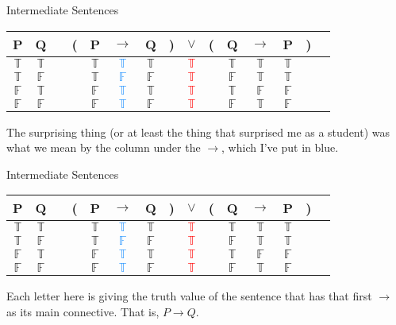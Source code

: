 \documentclass[
  ignorenonframetext,
]{beamer}
\renewcommand{\,}{\text{, }}
\def\True{\mathbb{T}}
\def\False{\mathbb{F}}
\begin{document}
\begin{frame}{Intermediate Sentences}
\protect\hypertarget{intermediate-sentences}{}
\begin{center}
\begin{tabular}{@{ }c@{ }@{ }c | c@{ }@{}c@{}@{ }c@{ }@{ }c@{ }@{ }c@{ }@{}c@{}@{ }c@{ }@{}c@{}@{ }c@{ }@{ }c@{ }@{ }c@{ }@{}c@{}@{ }c}
P & Q &  & ( & P & $\rightarrow$ & Q & ) & $\lor$ & ( & Q & $\rightarrow$ & P & ) & \\
\hline 
$\True$ & $\True$ &  &  & $\True$ & \textcolor{dodgerblue}{$\True$} & $\True$ &  & \textcolor{red}{$\True$} &  & $\True$ & $\True$ & $\True$ &  & \\
$\True$ & $\False$ &  &  & $\True$ & \textcolor{dodgerblue}{$\False$} & $\False$ &  & \textcolor{red}{$\True$} &  & $\False$ & $\True$ & $\True$ &  & \\
$\False$ & $\True$ &  &  & $\False$ & \textcolor{dodgerblue}{$\True$} & $\True$ &  & \textcolor{red}{$\True$} &  & $\True$ & $\False$ & $\False$ &  & \\
$\False$ & $\False$ &  &  & $\False$ & \textcolor{dodgerblue}{$\True$} & $\False$ &  & \textcolor{red}{$\True$} &  & $\False$ & $\True$ & $\False$ &  & \\
\end{tabular}

\end{center}

The surprising thing (or at least the thing that surprised me as a
student) was what we mean by the column under the \(\rightarrow\), which
I've put in blue.
\end{frame}

\begin{frame}{Intermediate Sentences}
\protect\hypertarget{intermediate-sentences-1}{}
\begin{center}
\begin{tabular}{@{ }c@{ }@{ }c | c@{ }@{}c@{}@{ }c@{ }@{ }c@{ }@{ }c@{ }@{}c@{}@{ }c@{ }@{}c@{}@{ }c@{ }@{ }c@{ }@{ }c@{ }@{}c@{}@{ }c}
P & Q &  & ( & P & $\rightarrow$ & Q & ) & $\lor$ & ( & Q & $\rightarrow$ & P & ) & \\
\hline 
$\True$ & $\True$ &  &  & $\True$ & \textcolor{dodgerblue}{$\True$} & $\True$ &  & \textcolor{red}{$\True$} &  & $\True$ & $\True$ & $\True$ &  & \\
$\True$ & $\False$ &  &  & $\True$ & \textcolor{dodgerblue}{$\False$} & $\False$ &  & \textcolor{red}{$\True$} &  & $\False$ & $\True$ & $\True$ &  & \\
$\False$ & $\True$ &  &  & $\False$ & \textcolor{dodgerblue}{$\True$} & $\True$ &  & \textcolor{red}{$\True$} &  & $\True$ & $\False$ & $\False$ &  & \\
$\False$ & $\False$ &  &  & $\False$ & \textcolor{dodgerblue}{$\True$} & $\False$ &  & \textcolor{red}{$\True$} &  & $\False$ & $\True$ & $\False$ &  & \\
\end{tabular}

\end{center}

Each letter here is giving the truth value of the sentence that has that
first \(\rightarrow\) as its main connective. That is,
\(P \rightarrow Q\).
\end{frame}
\end{document}
